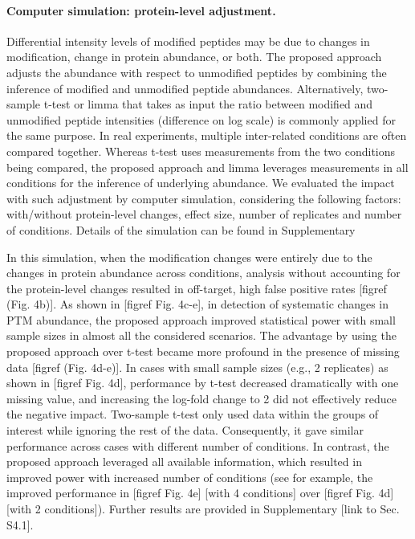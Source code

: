 \documentclass[mcp]{article}
\numberwithin{figure}{section} %
\numberwithin{table}{section}
\def\todo#1{{\color{red}[#1]}}
\begin{document}
\paragraph*{Computer simulation: protein-level adjustment.} 

Differential intensity levels of modified peptides may be due to changes in modification, change in protein abundance, or both. The proposed approach adjusts the abundance with respect to unmodified peptides by combining the inference of modified and unmodified peptide abundances. Alternatively, two-sample t-test or limma that takes as input the ratio between modified and unmodified peptide intensities (difference on log scale) is commonly applied for the same purpose. In real experiments, multiple inter-related conditions are often compared together. Whereas t-test uses measurements from the two conditions being compared, the proposed approach and limma leverages measurements in all conditions for the inference of underlying abundance. We evaluated the impact with such adjustment by computer simulation, considering the following factors: with/without protein-level changes, effect size, number of replicates and number of conditions. Details of the simulation can be found in Supplementary %

In this simulation, when the modification changes were entirely due to the changes in protein abundance across conditions, analysis without accounting for the protein-level changes resulted in off-target, high false positive rates \todo{figref (Fig. 4b)}. As shown in \todo{figref Fig. 4c-e}, in detection of systematic changes in PTM abundance, the proposed approach improved statistical power with small sample sizes in almost all the considered scenarios. The advantage by using the proposed approach over t-test became more profound in the presence of missing data \todo{figref (Fig. 4d-e)}. In cases with small sample sizes (e.g., 2 replicates) as shown in \todo{figref Fig. 4d}, performance by t-test decreased dramatically with one missing value, and increasing the log-fold change to 2 did not effectively reduce the negative impact. Two-sample t-test only used data within the groups of interest while ignoring the rest of the data. Consequently, it gave similar performance across cases with different number of conditions. In contrast, the proposed approach leveraged all available information, which resulted in improved power with increased number of conditions (see for example, the improved performance in \todo{figref Fig. 4e} [with 4 conditions] over \todo{figref Fig. 4d} [with 2 conditions]). Further results are provided in Supplementary \todo{link to Sec. S4.1}. 
\end{document}
